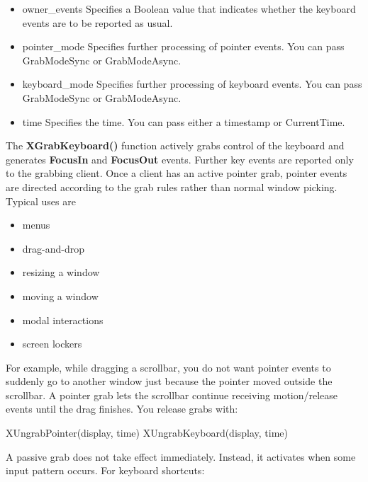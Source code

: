 \documentclass{report}
\begin{document}
\begin{itemize}
\begin{itemize}
                \item owner\_events	Specifies a Boolean value that indicates whether the keyboard events are to be reported as usual.
                \item pointer\_mode	Specifies further processing of pointer events. You can pass GrabModeSync or GrabModeAsync.
                \item keyboard\_mode	Specifies further processing of keyboard events. You can pass GrabModeSync or GrabModeAsync.
                \item time	Specifies the time. You can pass either a timestamp or CurrentTime.
            \end{itemize}
            The \textbf{XGrabKeyboard()} function actively grabs control of the keyboard and generates \textbf{FocusIn} and \textbf{FocusOut} events. Further key events are reported only to the grabbing client.
            \bigbreak \noindent 
            Once a client has an active pointer grab, pointer events are directed according to the grab rules rather than normal window picking. Typical uses are
            \begin{itemize}
                \item menus
                \item drag-and-drop
                \item resizing a window
                \item moving a window
                \item modal interactions
                \item screen lockers
            \end{itemize}
            For example, while dragging a scrollbar, you do not want pointer events to suddenly go to another window just because the pointer moved outside the scrollbar. A pointer grab lets the scrollbar continue receiving motion/release events until the drag finishes.
            \bigbreak \noindent 
            You release grabs with:
            \bigbreak \noindent 
            \begin{cppcode}
            XUngrabPointer(display, time)
            XUngrabKeyboard(display, time)
            \end{cppcode}
            \bigbreak \noindent 
            A passive grab does not take effect immediately. Instead, it activates when some input pattern occurs.
            \bigbreak \noindent 
            For keyboard shortcuts:
            \bigbreak \noindent 
            \begin{cppcode}

\end{cppcode}
\end{itemize}
\end{document}
